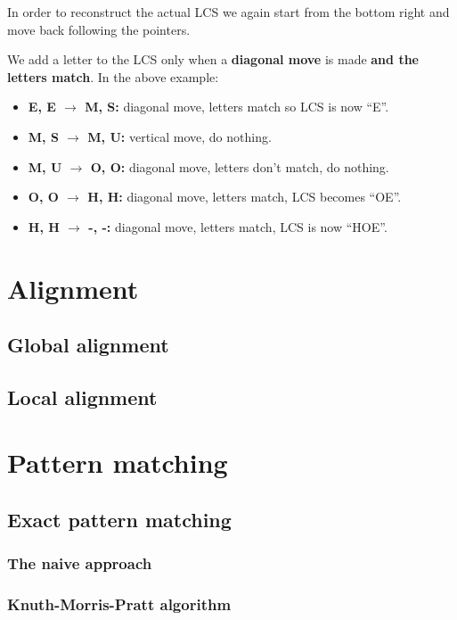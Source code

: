 \documentclass[12pt, letterpaper]{article}
\begin{document}
In order to reconstruct the actual LCS we again start from the bottom right and move back following the pointers.

We add a letter to the LCS only when a \textbf{diagonal move} is made \textbf{and the letters match}. In the above example:
\begin{itemize}
\item \textbf{E, E $\rightarrow$ M, S:} diagonal move, letters match so LCS is now ``E''.
\item \textbf{M, S $\rightarrow$ M, U:} vertical move, do nothing.
\item \textbf{M, U $\rightarrow$ O, O:} diagonal move, letters don't match, do nothing.
\item \textbf{O, O $\rightarrow$ H, H:} diagonal move, letters match, LCS becomes ``OE''.
\item \textbf{H, H $\rightarrow$ -, -:} diagonal move, letters match, LCS is now ``HOE''.
\end{itemize}

\section{Alignment}

\subsection{Global alignment}

\subsection{Local alignment}

\section{Pattern matching}

\subsection{Exact pattern matching}

\subsubsection{The naive approach}

\subsubsection{Knuth-Morris-Pratt algorithm}
\end{document}
